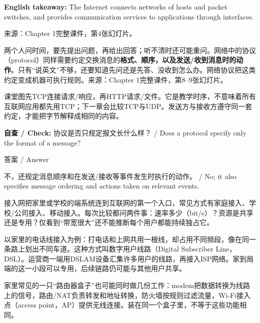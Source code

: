\textbf{English takeaway:} The Internet connects networks of hosts and packet switches, and provides communication services to applications through interfaces.


来源：Chapter 1完整课件，第4张幻灯片。





两个人问时间，要先提出问题，再给出回答；听不清时还可能重问。网络中的协议（protocol）同样需要约定交换消息的\textbf{格式、顺序，以及发送/收到消息时的动作}。只有“说英文”不够，还要知道先问还是先答、没收到怎么办。网络协议把这类约定变成机器可执行规则。来源：Chapter 1完整课件，第8–9张幻灯片。


课堂图先TCP连接请求/响应，再HTTP请求/文件。它是教学时序，不意味着所有互联网应用都先用TCP；下一章会比较TCP与UDP。发送方与接收方遵守同一套约定，才能把字节解释成相同的内容。


\textbf{自查 / Check:} 协议是否只规定报文长什么样？ / Does a protocol specify only the format of a message?



\begin{StudySolution}{答案 / Answer}


不，还规定消息顺序和在发送/接收等事件发生时执行的动作。 / No; it also specifies message ordering and actions taken on relevant events.


\end{StudySolution}





接入网把家里或学校的端系统连到互联网的第一个入口，常见方式有家庭接入、学校/公司接入、移动接入。每次比较都问两件事：速率多少（bit/s）？资源是共享还是专用？仅看到“带宽很大”还不能推断每个用户都能持续独占它。


以家里的电话线接入为例：打电话和上网共用一根线，却占用不同频段，像在同一条路上划出不同车道。这种方式叫数字用户线路（Digital Subscriber Line，DSL）。运营商一端用DSLAM设备汇集许多用户的线路，再接入ISP网络。家到局端的这一小段可以专用，后续链路仍可能与其他用户共享。


家里常见的一只“路由器盒子”也可能同时做几份工作：modem把数据转换为线路上的信号，路由/NAT负责转发和地址转换，防火墙按规则过滤流量，Wi-Fi接入点（access point，AP）提供无线连接。装在同一个盒子里，不等于这些功能相同。


